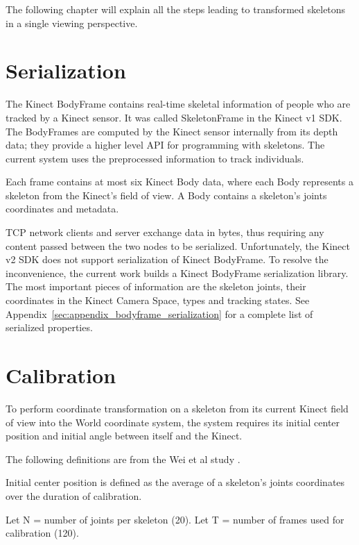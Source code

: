 The following chapter will explain all the steps leading to transformed skeletons in a single viewing perspective.

\section{Serialization}
\label{sec:current_approach_serialization}

The Kinect BodyFrame contains real-time skeletal information of people who are tracked by a Kinect sensor. It was called SkeletonFrame in the Kinect v1 SDK. The BodyFrames are computed by the Kinect sensor internally from its depth data; they provide a higher level API for programming with skeletons. The current system uses the preprocessed information to track individuals.

Each frame contains at most six Kinect Body data, where each Body represents a skeleton from the Kinect's field of view. A Body contains a skeleton's joints coordinates and metadata.

TCP network clients and server exchange data in bytes, thus requiring any content passed between the two nodes to be serialized. Unfortunately, the Kinect v2 SDK does not support serialization of Kinect BodyFrame. To resolve the inconvenience, the current work builds a Kinect BodyFrame serialization library. The most important pieces of information are the skeleton joints, their coordinates in the Kinect Camera Space, types and tracking states. See Appendix~\ref{sec:appendix_bodyframe_serialization} for a complete list of serialized properties.

\section{Calibration}
\label{sec:current_approach_calibration}

To perform coordinate transformation on a skeleton from its current Kinect field of view into the World coordinate system, the system requires its initial center position and initial angle between itself and the Kinect.  

The following definitions are from the Wei et al study \cite{wei_kinect_calibration}.

Initial center position is defined as the average of a skeleton's joints coordinates over the duration of calibration.

Let N = number of joints per skeleton (20). Let T = number of frames used for calibration (120).


